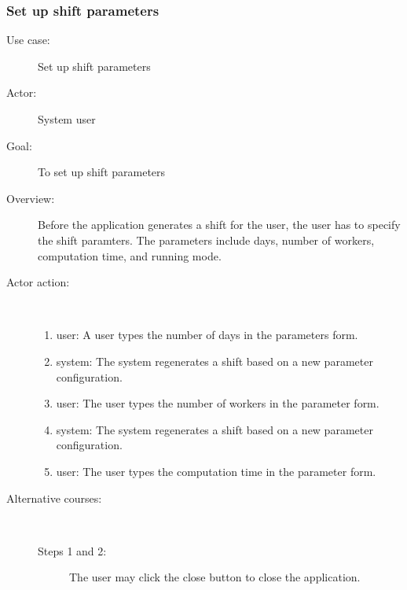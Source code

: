 \documentclass[11pt, oneside]{article}   	%
\begin{document}
\subsubsection{Set up shift parameters}
\begin{description}
\item[Use case:] Set up shift parameters
\item[Actor:] System user
\item[Goal:] To set up shift parameters
\item[Overview:] Before the application generates a shift for the user, the user has to specify the shift paramters.
The parameters include days, number of workers, computation time, and running mode.
\item[Actor action:]
\
\begin{enumerate}
\item user: A user types the number of days in the parameters form.
\item system: The system regenerates a shift based on a new parameter configuration.
\item user: The user types the number of workers in the parameter form.
\item system: The system regenerates a shift based on a new parameter configuration.
\item user: The user types the computation time in the parameter form.
\end{enumerate}

\item[Alternative courses:]
\
\begin{description}
\item[Steps 1 and 2:] The user may click the close button to close the application.
\end{description}

\end{description}
\end{document}

